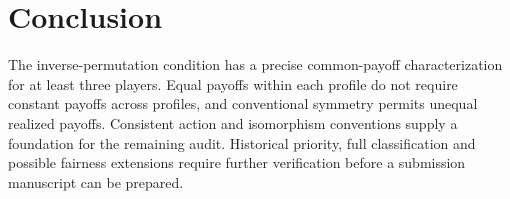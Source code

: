 \section{Conclusion}
The inverse-permutation condition has a precise common-payoff characterization
for at least three players. Equal payoffs within each profile do not require
constant payoffs across profiles, and conventional symmetry permits unequal
realized payoffs. Consistent action and isomorphism conventions supply a
foundation for the remaining audit. Historical priority, full classification
and possible fairness extensions require further verification before a
submission manuscript can be prepared.
